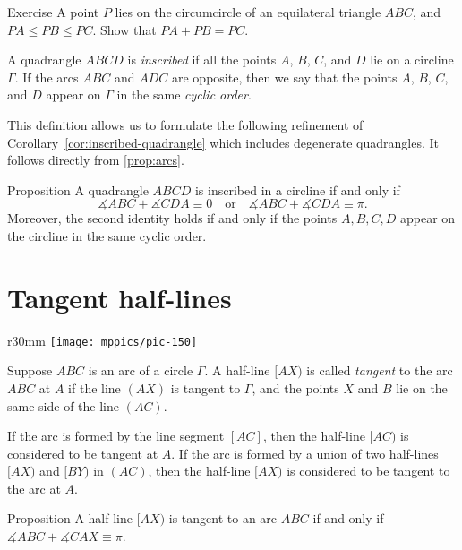 \begin{thm}{Exercise}\label{ex:a+b=c}
A point $P$ lies on the circumcircle of an equilateral triangle $ABC$,
and $PA\le PB\le PC$.
Show that $PA+PB=PC$.
\end{thm}

A quadrangle $ABCD$ is 
\emph{inscribed}
if all the points $A$, $B$, $C$, and $D$ lie on a circline $\Gamma$.
If the arcs $ABC$ and $ADC$ are opposite, then we say that the points $A$, $B$, $C$, and $D$ appear on $\Gamma$ in the same \emph{cyclic order}.

This definition allows us to formulate the following refinement of Corollary~\ref{cor:inscribed-quadrangle} which includes degenerate quadrangles.
It follows directly from \ref{prop:arcs}.

\begin{thm}{Proposition}\label{prop:inscribed-quadrangle}
A quadrangle $ABCD$ is inscribed in a circline if and only if 
\[\measuredangle ABC+\measuredangle CDA\equiv 0
\quad\text{or}\quad
\measuredangle ABC+\measuredangle CDA\equiv\pi.\]
Moreover, the second identity holds if and only if the points $A,B,C,D$ appear on the circline in the same cyclic order.
\end{thm}

\section{Tangent half-lines}

\begin{wrapfigure}[6]{r}{30mm}
\vskip-10mm
\centering
\texttt{[image: mppics/pic-150]}
\end{wrapfigure}

Suppose $ABC$ is an arc of a circle $\Gamma$.
A half-line $[AX)$ is called 
\emph{tangent} 
to the arc $ABC$ at $A$
if the line $(AX)$ is tangent to $\Gamma$, and the points $X$ and $B$ lie on the same side of the line $(AC)$.

If the arc is formed by the line segment $[AC]$, then the half-line $[AC)$ is considered to be tangent at $A$.
If the arc is formed by a union of two half-lines $[AX)$ and $[BY)$ in $(AC)$,
then the half-line $[AX)$ is considered to be tangent to the arc at $A$.

\begin{thm}{Proposition}\label{prop:arc(angle=tan)}
A half-line $[AX)$ is tangent to an arc $ABC$ if and only if 
$\measuredangle ABC+\measuredangle CAX\equiv \pi$.
\end{thm}

